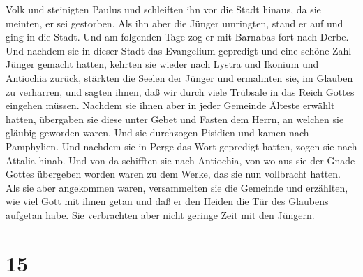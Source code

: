 Volk und steinigten Paulus und schleiften ihn vor die Stadt hinaus, da
sie meinten, er sei gestorben.  Als ihn aber die Jünger
umringten, stand er auf und ging in die Stadt. Und am folgenden Tage zog
er mit Barnabas fort nach Derbe.  Und nachdem sie in
dieser Stadt das Evangelium gepredigt und eine schöne Zahl Jünger
gemacht hatten, kehrten sie wieder nach Lystra und Ikonium und Antiochia
zurück,  stärkten die Seelen der Jünger und ermahnten
sie, im Glauben zu verharren, und sagten ihnen, daß wir durch viele
Trübsale in das Reich Gottes eingehen müssen.  Nachdem
sie ihnen aber in jeder Gemeinde Älteste erwählt hatten, übergaben sie
diese unter Gebet und Fasten dem Herrn, an welchen sie gläubig geworden
waren.  Und sie durchzogen Pisidien und kamen nach
Pamphylien.  Und nachdem sie in Perge das Wort gepredigt
hatten, zogen sie nach Attalia hinab.  Und von da
schifften sie nach Antiochia, von wo aus sie der Gnade Gottes übergeben
worden waren zu dem Werke, das sie nun vollbracht hatten.
 Als sie aber angekommen waren, versammelten sie die
Gemeinde und erzählten, wie viel Gott mit ihnen getan und daß er den
Heiden die Tür des Glaubens aufgetan habe.  Sie
verbrachten aber nicht geringe Zeit mit den Jüngern.

\hypertarget{section-14}{%
\section{15}\label{section-14}}

